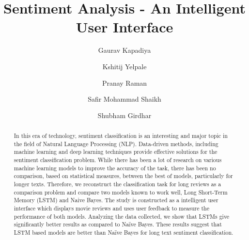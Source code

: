 \documentclass[sigplan,screen]{acmart}
\begin{document}
\title{Sentiment Analysis - An Intelligent User Interface}



\author{Gaurav Kapadiya}


\author{ Kshitij Yelpale}



\author{Pranay Raman }



\author{Safir Mohammad Shaikh}

\author{Shubham Girdhar}


\begin{abstract}
In this era of technology, sentiment classification is an interesting and major topic in the field of Natural Language Processing (NLP). Data-driven methods, including machine learning and deep learning techniques provide effective solutions for the sentiment classification problem. While there has been a lot of research on various machine learning models to improve the accuracy of the task, there has been no comparison, based on statistical measures, between the best of models, particularly for longer texts. Therefore, we reconstruct the classification task for long reviews as a comparison problem and compare two models known to work well, Long Short-Term Memory (LSTM) and Naive Bayes. The study is constructed as a intelligent user interface which displays movie reviews and uses user feedback to measure the performance of both models. Analyzing the data collected, we show that LSTMs give significantly better results as compared to Naïve Bayes. These results suggest that LSTM based models are better than Naïve Bayes for long text sentiment classification.
\end{abstract}
\end{document}

